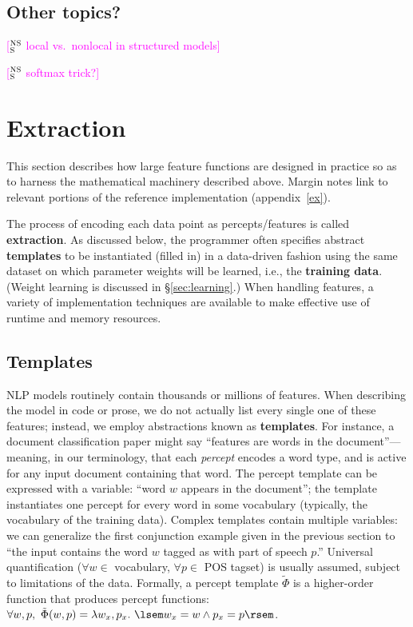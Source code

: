 \documentclass[11pt,letterpaper]{article}
\newcommand{\ensuretext}[1]{#1}
\newcommand{\nssmarker}{\ensuretext{\textcolor{magenta}{\ensuremath{^{\textsc{NS}}_{\textsc{S}}}}}}
\newcommand{\arkcomment}[3]{\ensuretext{\textcolor{#3}{[#1 #2]}}}
\newcommand{\nss}[1]{\arkcomment{\nssmarker}{#1}{magenta}}
\newcommand{\Sref}[1]{\S\ref{#1}}
\newcommand{\appref}[1]{appendix~\ref{#1}}
\begin{document}
\subsection{Other topics?}

\nss{local vs.~nonlocal in structured models}

\nss{softmax trick?}

\section{Extraction}\label{sec:extraction}

This section describes how large feature functions are designed in practice
so as to harness the mathematical machinery described above.
Margin notes link to relevant portions of the reference implementation (\appref{ex}).

The process of encoding 
each data point as percepts\slash features is called \textbf{extraction}.
As discussed below, the programmer often specifies abstract \textbf{templates} 
to be instantiated (filled in) in a data-driven fashion
using the same dataset on which parameter weights will be learned, 
i.e., the \textbf{training data}. (Weight learning is discussed in \Sref{sec:learning}.)
When handling features, a variety of implementation techniques 
are available to make effective use of runtime and memory resources.

\subsection{Templates}

NLP models routinely contain thousands or millions of features. 
When describing the model in code or prose, we do not actually list every single one of these features; 
instead, we employ abstractions known as \textbf{templates}. 
For instance, a document classification paper might say ``features are words in the document''---meaning, 
in our terminology, that each {\em percept} encodes a word type, and is active for any input document containing that word.
The percept template can be expressed with a variable: ``word $w$ appears in the document''; 
the template instantiates one percept for every word in some vocabulary 
(typically, the vocabulary of the training data). 
Complex templates contain multiple variables: we can generalize the first conjunction example given in the previous section to 
``the input contains the word $w$ tagged as with part of speech $p$.'' 
Universal quantification ($\forall w \in$ vocabulary, $\forall p \in$ POS tagset) 
is usually assumed, subject to limitations of the data.
Formally, a percept template $\tilde{\Phi}$ is a higher-order function 
that produces percept functions: $\forall w,p,\ \tilde{\Phi}(w, p) = \lambda w_x,p_x.\ \lsem w_x=w \wedge p_x=p \rsem$.
\end{document}
